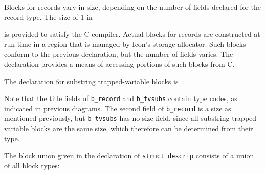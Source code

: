 
Blocks for records vary in size, depending on the number of fields
declared for the record type. The size of 1 in


\noindent is provided to satisfy the C compiler. Actual blocks for
records are constructed at run time in a region that is managed by
Icon's storage allocator. Such blocks conform to the previous
declaration, but the number of fields varies. The declaration provides
a means of accessing portions of such blocks from C.

The declaration for substring trapped-variable blocks is

\goodbreak
{}

Note that the title fields of \texttt{b\_record} and
\texttt{b\_tvsubs} contain type codes, as indicated in previous
diagrams. The second field of \texttt{b\_record} is a size as
mentioned previously, but \texttt{b\_tvsubs} has no size field, since
all substring trapped-variable blocks are the same size, which therefore
can be determined from their type.

The block union given in the declaration of \texttt{struct descrip}
consists of a union of all block types:

